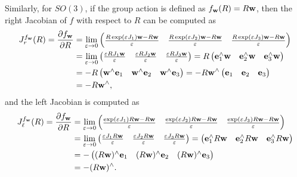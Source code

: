 Similarly, for $SO(3)$, if the group action is defined as $f_{\mathbf{w}}(R) = R\mathbf{w}$, then the right Jacobian of $f$ with respect to $R$ can be computed as
\begin{align*}
J_r^{f_{\mathbf{w}}}(R) = \frac{\partial f_{\mathbf{w}}}{\partial R} &= \lim_{\varepsilon \to 0} \begin{pmatrix} 
 	\frac{R\exp(\varepsilon J_1)\mathbf{w} - R\mathbf{w}}{\varepsilon} & 
 	\frac{R\exp(\varepsilon J_2)\mathbf{w} - R\mathbf{w}}{\varepsilon} &
 	\frac{R\exp(\varepsilon J_3)\mathbf{w} - R\mathbf{w}}{\varepsilon}
 \end{pmatrix} \\
 &= \lim_{\varepsilon \to 0} \begin{pmatrix} 
 	\frac{\varepsilon RJ_1\mathbf{w}}{\varepsilon} & 
 	\frac{\varepsilon RJ_2\mathbf{w}}{\varepsilon} &
 	\frac{\varepsilon RJ_3\mathbf{w}}{\varepsilon}
 \end{pmatrix}
  = R\begin{pmatrix} 
 	\mathbf{e}_1^\wedge\mathbf{w} & 
 	\mathbf{e}_2^\wedge\mathbf{w} & 
 	\mathbf{e}_3^\wedge\mathbf{w} 
 \end{pmatrix} \\
 &= -R\begin{pmatrix} 
 	\mathbf{w}^\wedge\mathbf{e}_1 & 
 	\mathbf{w}^\wedge\mathbf{e}_2 & 
 	\mathbf{w}^\wedge\mathbf{e}_3 
 \end{pmatrix} 
  = -R\mathbf{w}^\wedge \begin{pmatrix} 
 	\mathbf{e}_1 & 
 	\mathbf{e}_2 & 
 	\mathbf{e}_3 
 \end{pmatrix}\\
   &= -R\mathbf{w}^\wedge,
\end{align*}
and the left Jacobian is computed as
\begin{align*}
J_\ell^{f_{\mathbf{w}}}(R) = \frac{\partial f_{\mathbf{w}}}{\partial R} &= \lim_{\varepsilon \to 0} \begin{pmatrix} 
 	\frac{\exp(\varepsilon J_1)R\mathbf{w} - R\mathbf{w}}{\varepsilon} & 
 	\frac{\exp(\varepsilon J_2)R\mathbf{w} - R\mathbf{w}}{\varepsilon} &
 	\frac{\exp(\varepsilon J_3)R\mathbf{w} - R\mathbf{w}}{\varepsilon}
 \end{pmatrix} \\
 &= \lim_{\varepsilon \to 0} \begin{pmatrix} 
 	\frac{\varepsilon J_1R\mathbf{w}}{\varepsilon} & 
 	\frac{\varepsilon J_2R\mathbf{w}}{\varepsilon} &
 	\frac{\varepsilon J_3R\mathbf{w}}{\varepsilon}
 \end{pmatrix}
  = \begin{pmatrix} 
 	\mathbf{e}_1^\wedge R\mathbf{w} & 
 	\mathbf{e}_2^\wedge R\mathbf{w} & 
 	\mathbf{e}_3^\wedge R\mathbf{w} 
 \end{pmatrix} \\
 &= -\begin{pmatrix} 
 	(R\mathbf{w})^\wedge\mathbf{e}_1 & 
 	(R\mathbf{w})^\wedge\mathbf{e}_2 & 
 	(R\mathbf{w})^\wedge\mathbf{e}_3 
 \end{pmatrix} \\
   &= -(R\mathbf{w})^\wedge.
\end{align*}

